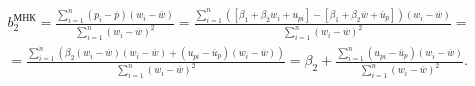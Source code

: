 \documentclass[a4paper,12pt]{article}
\begin{document}
\begin{multline}
	b^{МНК}_2 = \frac{\sum\limits_{i=1}^{n} (p_i - \overline{p})(w_i - \overline{w})} {\sum\limits_{i=1}^{n}(w_i - \overline{w})^2} = 
	\frac{\sum\limits_{i=1}^{n} ([\beta_1 + \beta_2 w_i + u_{pi}] - [\beta_1 + \beta_2 \overline{w} + \overline{u}_p])
		 (w_i - \overline{w})}
	{\sum\limits_{i=1}^{n}(w_i - \overline{w})^2} = \\
	= \frac{\sum\limits_{i=1}^{n} (\beta_2(w_i - \overline{w})(w_i - \overline{w}) +
	 (u_{pi} - \overline{u}_p)(w_i - \overline{w}))}
	{\sum\limits_{i=1}^{n}(w_i - \overline{w})^2} =
	\beta_2 + \frac{\sum\limits_{i=1}^{n} (u_{pi} - \overline{u}_p)(w_i - \overline{w})} {\sum\limits_{i=1}^{n}(w_i - \overline{w})^2}.  \tag{$\Upsilon$}
\end{multline}
\end{document}
